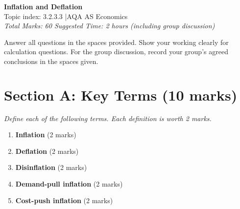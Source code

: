 \documentclass[12pt,a4paper]{article}
\begin{document}
\begin{center}
    \Large\textbf{Inflation and Deflation}\\[5pt]
    \normalsize Topic index: 3.2.3.3 \quad|\quad AQA AS Economics\\[3pt]
    \textit{Total Marks: 60 \quad Suggested Time: 2 hours (including group discussion)}
\end{center}

\vspace{0.8em}

\begin{instructions}
    Answer all questions in the spaces provided. Show your working clearly for calculation questions. For the group discussion, record your group's agreed conclusions in the spaces given.
\end{instructions}

\vspace{1em}

\section*{Section A: Key Terms (10 marks)}

\textit{Define each of the following terms. Each definition is worth 2 marks.}

\vspace{0.5em}

\begin{enumerate}[leftmargin=*, label=\textbf{\arabic*.}]

    \item \textbf{Inflation} \hfill (2 marks)\\[3cm]

    \item \textbf{Deflation} \hfill (2 marks)\\[3cm]

    \item \textbf{Disinflation} \hfill (2 marks)\\[3cm]

    \item \textbf{Demand-pull inflation} \hfill (2 marks)\\[3cm]

    \item \textbf{Cost-push inflation} \hfill (2 marks)\\[3cm]

\end{enumerate}
\end{document}
